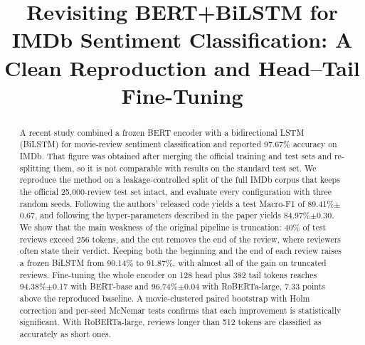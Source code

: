 \documentclass[conference]{IEEEtran}
\begin{document}
\title{Revisiting BERT+BiLSTM for IMDb Sentiment Classification: A Clean Reproduction and Head--Tail Fine-Tuning}

\author{
\and
{}
\and
{}
}

\maketitle

\begin{abstract}
A recent study combined a frozen BERT encoder with a bidirectional LSTM (BiLSTM) for movie-review sentiment classification and reported 97.67\% accuracy on IMDb. That figure was obtained after merging the official training and test sets and re-splitting them, so it is not comparable with results on the standard test set. We reproduce the method on a leakage-controlled split of the full IMDb corpus that keeps the official 25{,}000-review test set intact, and evaluate every configuration with three random seeds. Following the authors' released code yields a test Macro-F1 of 89.41\%$\pm$0.67, and following the hyper-parameters described in the paper yields 84.97\%$\pm$0.30. We show that the main weakness of the original pipeline is truncation: 40\% of test reviews exceed 256 tokens, and the cut removes the end of the review, where reviewers often state their verdict. Keeping both the beginning and the end of each review raises a frozen BiLSTM from 90.14\% to 91.87\%, with almost all of the gain on truncated reviews. Fine-tuning the whole encoder on 128 head plus 382 tail tokens reaches 94.38\%$\pm$0.17 with BERT-base and 96.74\%$\pm$0.04 with RoBERTa-large, 7.33 points above the reproduced baseline. A movie-clustered paired bootstrap with Holm correction and per-seed McNemar tests confirms that each improvement is statistically significant. With RoBERTa-large, reviews longer than 512 tokens are classified as accurately as short ones.
\end{abstract}
\end{document}
